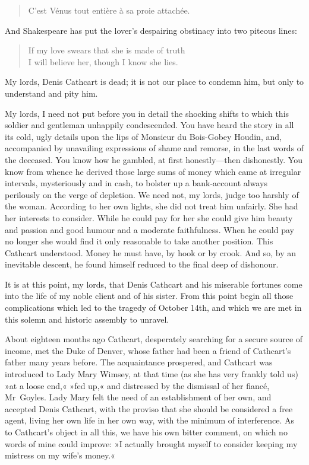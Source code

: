 \begin{dialogue}
\begin{quote}C'est Vénus tout entière à sa proie attachée.\end{quote}

\smallskip 

And Shakespeare has put the lover's despairing obstinacy into two piteous lines:

\begin{verse}
If my love swears that she is made of truth\\
I will believe her, though I know she lies.\\
\end{verse}

\smallskip 

My lords, Denis Cathcart is dead; it is not our place to condemn him, but only to understand and pity him.

\smallskip 

My lords, I need not put before you in detail the shocking shifts to which this soldier and gentleman unhappily condescended. You have heard the story in all its cold, ugly details upon the lips of Monsieur du Bois-Gobey Houdin, and, accompanied by unavailing expressions of shame and remorse, in the last words of the deceased. You know how he gambled, at first honestly—then dishonestly. You know from whence he derived those large sums of money which came at irregular intervals, mysteriously and in cash, to bolster up a bank-account always perilously on the verge of depletion. We need not, my lords, judge too harshly of the woman. According to her own lights, she did not treat him unfairly. She had her interests to consider. While he could pay for her she could give him beauty and passion and good humour and a moderate faithfulness. When he could pay no longer she would find it only reasonable to take another position. This Cathcart understood. Money he must have, by hook or by crook. And so, by an inevitable descent, he found himself reduced to the final deep of dishonour.

\smallskip 

It is at this point, my lords, that Denis Cathcart and his miserable fortunes come into the life of my noble client and of his sister. From this point begin all those complications which led to the tragedy of October 14th, and which we are met in this solemn and historic assembly to unravel.

\smallskip 

About eighteen months ago Cathcart, desperately searching for a secure source of income, met the Duke of Denver, whose father had been a friend of Cathcart's father many years before. The acquaintance prospered, and Cathcart was introduced to Lady Mary Wimsey, at that time (as she has very frankly told us) »at a loose end,« »fed up,« and distressed by the dismissal of her fiancé, Mr~Goyles. Lady Mary felt the need of an establishment of her own, and accepted Denis Cathcart, with the proviso that she should be considered a free agent, living her own life in her own way, with the minimum of interference. As to Cathcart's object in all this, we have his own bitter comment, on which no words of mine could improve: »I actually brought myself to consider keeping my mistress on my wife's money.«


\end{dialogue}
